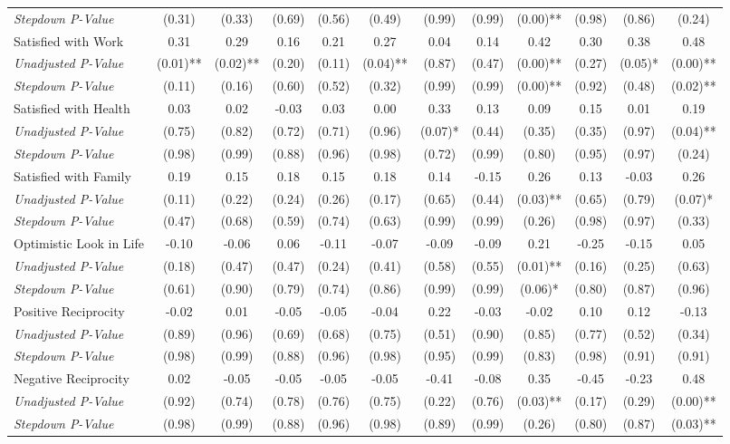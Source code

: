 \begin{tabular}{l c c c c c c c c c c c}
\quad \textit{Stepdown P-Value} & (0.31) & (0.33) & (0.69) & (0.56) & (0.49) & (0.99) & (0.99) & (0.00)** & (0.98) & (0.86) & (0.24) \\
Satisfied with Work & 0.31 & 0.29 & 0.16 & 0.21 & 0.27 & 0.04 & 0.14 & 0.42 & 0.30 & 0.38 & 0.48 \\
\quad \textit{Unadjusted P-Value} & (0.01)** & (0.02)** & (0.20) & (0.11) & (0.04)** & (0.87) & (0.47) & (0.00)** & (0.27) & (0.05)* & (0.00)** \\
\quad \textit{Stepdown P-Value} & (0.11) & (0.16) & (0.60) & (0.52) & (0.32) & (0.99) & (0.99) & (0.00)** & (0.92) & (0.48) & (0.02)** \\
Satisfied with Health & 0.03 & 0.02 & -0.03 & 0.03 & 0.00 & 0.33 & 0.13 & 0.09 & 0.15 & 0.01 & 0.19 \\
\quad \textit{Unadjusted P-Value} & (0.75) & (0.82) & (0.72) & (0.71) & (0.96) & (0.07)* & (0.44) & (0.35) & (0.35) & (0.97) & (0.04)** \\
\quad \textit{Stepdown P-Value} & (0.98) & (0.99) & (0.88) & (0.96) & (0.98) & (0.72) & (0.99) & (0.80) & (0.95) & (0.97) & (0.24) \\
Satisfied with Family & 0.19 & 0.15 & 0.18 & 0.15 & 0.18 & 0.14 & -0.15 & 0.26 & 0.13 & -0.03 & 0.26 \\
\quad \textit{Unadjusted P-Value} & (0.11) & (0.22) & (0.24) & (0.26) & (0.17) & (0.65) & (0.44) & (0.03)** & (0.65) & (0.79) & (0.07)* \\
\quad \textit{Stepdown P-Value} & (0.47) & (0.68) & (0.59) & (0.74) & (0.63) & (0.99) & (0.99) & (0.26) & (0.98) & (0.97) & (0.33) \\
Optimistic Look in Life & -0.10 & -0.06 & 0.06 & -0.11 & -0.07 & -0.09 & -0.09 & 0.21 & -0.25 & -0.15 & 0.05 \\
\quad \textit{Unadjusted P-Value} & (0.18) & (0.47) & (0.47) & (0.24) & (0.41) & (0.58) & (0.55) & (0.01)** & (0.16) & (0.25) & (0.63) \\
\quad \textit{Stepdown P-Value} & (0.61) & (0.90) & (0.79) & (0.74) & (0.86) & (0.99) & (0.99) & (0.06)* & (0.80) & (0.87) & (0.96) \\
Positive Reciprocity & -0.02 & 0.01 & -0.05 & -0.05 & -0.04 & 0.22 & -0.03 & -0.02 & 0.10 & 0.12 & -0.13 \\
\quad \textit{Unadjusted P-Value} & (0.89) & (0.96) & (0.69) & (0.68) & (0.75) & (0.51) & (0.90) & (0.85) & (0.77) & (0.52) & (0.34) \\
\quad \textit{Stepdown P-Value} & (0.98) & (0.99) & (0.88) & (0.96) & (0.98) & (0.95) & (0.99) & (0.83) & (0.98) & (0.91) & (0.91) \\
Negative Reciprocity & 0.02 & -0.05 & -0.05 & -0.05 & -0.05 & -0.41 & -0.08 & 0.35 & -0.45 & -0.23 & 0.48 \\
\quad \textit{Unadjusted P-Value} & (0.92) & (0.74) & (0.78) & (0.76) & (0.75) & (0.22) & (0.76) & (0.03)** & (0.17) & (0.29) & (0.00)** \\
\quad \textit{Stepdown P-Value} & (0.98) & (0.99) & (0.88) & (0.96) & (0.98) & (0.89) & (0.99) & (0.26) & (0.80) & (0.87) & (0.03)** \\
\bottomrule
\end{tabular}
